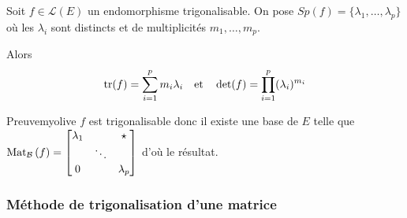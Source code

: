     \begin{prop}{}{}
        Soit $f \in \mathcal{L}(E)$ un endomorphisme trigonalisable. On pose $Sp(f) = \big\{ \lambda_1 , \ldots, \lambda_p  \big\}$ où les $\lambda_i$ sont distincts et de multiplicités $m_1,\ldots,m_p$.

        Alors \[ \operatorname{tr}(f) = \sum_{i=1}^{p} m_i \lambda_i \quad \text{et} \quad \operatorname{det}(f) = \prod_{i=1}^{p} (\lambda_i)^{m_i} \]
    \end{prop}

    \begin{demo}{Preuve}{myolive}
        $f$ est trigonalisable donc il existe une base de $E$ telle que $\text{Mat}_{\mathcal{B}}\left(f\right) = \begin{bmatrix}
            \lambda_1 & & \star \\
            & \ddots & \\
            0 & & \lambda_p
        \end{bmatrix}$ d’où le résultat.
    \end{demo}

    \subsubsection{Méthode de trigonalisation d’une matrice}

